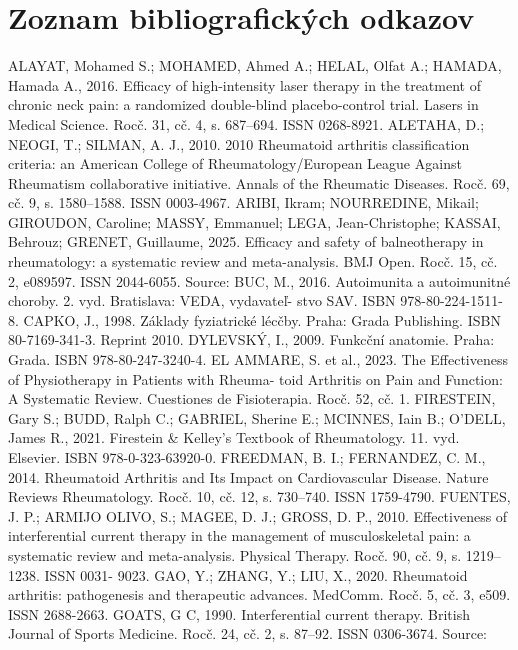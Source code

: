 \chapter*{Zoznam bibliografických odkazov}
ALAYAT, Mohamed S.; MOHAMED, Ahmed A.; HELAL, Olfat A.; HAMADA, Hamada
A., 2016. Efficacy of high-intensity laser therapy in the treatment of chronic neck pain: a
randomized double-blind placebo-control trial. Lasers in Medical Science. Rocč. 31, cč. 4,
s. 687–694. ISSN 0268-8921.
ALETAHA, D.; NEOGI, T.; SILMAN, A. J., 2010. 2010 Rheumatoid arthritis classification
criteria: an American College of Rheumatology/European League Against Rheumatism
collaborative initiative. Annals of the Rheumatic Diseases. Rocč. 69, cč. 9, s. 1580–1588.
ISSN 0003-4967.
ARIBI, Ikram; NOURREDINE, Mikail; GIROUDON, Caroline; MASSY, Emmanuel; LEGA,
Jean-Christophe; KASSAI, Behrouz; GRENET, Guillaume, 2025. Efficacy and safety
of balneotherapy in rheumatology: a systematic review and meta-analysis. BMJ Open.
Rocč. 15, cč. 2, e089597. ISSN 2044-6055. Source:
BUC, M., 2016. Autoimunita a autoimunitné choroby. 2. vyd. Bratislava: VEDA, vydavateľ-
stvo SAV. ISBN 978-80-224-1511-8.
CAPKO, J., 1998. Základy fyziatrické lécčby. Praha: Grada Publishing. ISBN 80-7169-341-3.
Reprint 2010.
DYLEVSKÝ, I., 2009. Funkcční anatomie. Praha: Grada. ISBN 978-80-247-3240-4.
EL AMMARE, S. et al., 2023. The Effectiveness of Physiotherapy in Patients with Rheuma-
toid Arthritis on Pain and Function: A Systematic Review. Cuestiones de Fisioterapia.
Rocč. 52, cč. 1.
FIRESTEIN, Gary S.; BUDD, Ralph C.; GABRIEL, Sherine E.; MCINNES, Iain B.; O’DELL,
James R., 2021. Firestein & Kelley’s Textbook of Rheumatology. 11. vyd. Elsevier. ISBN
978-0-323-63920-0.
FREEDMAN, B. I.; FERNANDEZ, C. M., 2014. Rheumatoid Arthritis and Its Impact on
Cardiovascular Disease. Nature Reviews Rheumatology. Rocč. 10, cč. 12, s. 730–740. ISSN
1759-4790.
FUENTES, J. P.; ARMIJO OLIVO, S.; MAGEE, D. J.; GROSS, D. P., 2010. Effectiveness
of interferential current therapy in the management of musculoskeletal pain: a systematic
review and meta-analysis. Physical Therapy. Rocč. 90, cč. 9, s. 1219–1238. ISSN 0031-
9023.
GAO, Y.; ZHANG, Y.; LIU, X., 2020. Rheumatoid arthritis: pathogenesis and therapeutic
advances. MedComm. Rocč. 5, cč. 3, e509. ISSN 2688-2663.
GOATS, G C, 1990. Interferential current therapy. British Journal of Sports Medicine. Rocč. 24,
cč. 2, s. 87–92. ISSN 0306-3674. Source:


